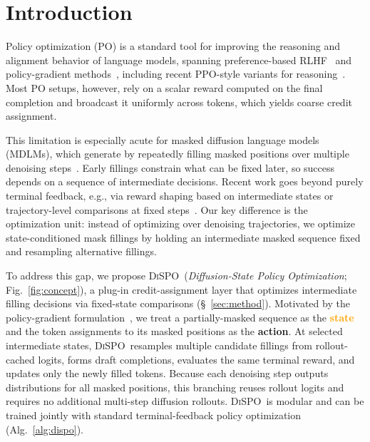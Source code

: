\documentclass{article}
\newcommand{\method}{{\textsc{DiSPO}}}
\newcommand{\action}[1]{\textbf{\textcolor{JungleGreen}{#1}}}
\newcommand{\state}[1]{\textbf{\textcolor{Orange}{#1}}}
\theoremstyle{plain}
\theoremstyle{definition}
\theoremstyle{remark}
\begin{document}
\section{Introduction}\label{sec:intro}
Policy optimization (PO) is a standard tool for improving the reasoning and alignment behavior of language models, spanning preference-based RLHF~\citep{ziegler2019fine,stiennon2020summarize,ouyang2022training} and policy-gradient methods~\citep{schulman2015trust,schulman2017proximal}, including recent PPO-style variants for reasoning~\citep{shao2024deepseekmath}.
Most PO setups, however, rely on a scalar reward computed on the final completion and broadcast it uniformly across tokens, which yields coarse credit assignment.

This limitation is especially acute for masked diffusion language models (MDLMs), which generate by repeatedly filling masked positions over multiple denoising steps~\citep{austin2021structured,sahoo2024simple,shi2024simplified,nie2025largelanguagediffusionmodels,ye2025dream,gong2025diffucoder}.
Early fillings constrain what can be fixed later, so success depends on a sequence of intermediate decisions.
Recent work goes beyond purely terminal feedback, e.g., via reward shaping based on intermediate states or trajectory-level comparisons at fixed steps~\citep{sapo,mdpo}.
{{Our key difference is the optimization unit:}} instead of optimizing over denoising trajectories, we optimize state-conditioned mask fillings by holding an intermediate masked sequence fixed and resampling alternative fillings.

To address this gap, we propose \method\ (\emph{Diffusion-State Policy Optimization}; Fig.~\ref{fig:concept}), a plug-in credit-assignment layer that optimizes intermediate filling decisions via fixed-state comparisons (\S~\ref{sec:method}).
Motivated by the policy-gradient formulation~\citep{williams1992simple,sutton1999policy}, we treat a partially-masked sequence as the \state{state} and the token assignments to its masked positions as the \action{action}.
At selected intermediate states, \method\ resamples multiple candidate fillings from rollout-cached logits, forms draft completions, evaluates the same terminal reward, and updates only the newly filled tokens.
Because each denoising step outputs distributions for all masked positions, this branching reuses rollout logits and requires no additional multi-step diffusion rollouts.
\method\ is modular and can be trained jointly with standard terminal-feedback policy optimization (Alg.~\ref{alg:dispo}).
\end{document}
